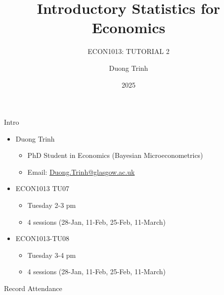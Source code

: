 \documentclass[
  11pt,
  ignorenonframetext,
]{beamer}
\title{Introductory Statistics for Economics}
\subtitle{ECON1013: TUTORIAL 2}
\author{Duong Trinh}
\date{2025}
\institute{University of Glasgow}
\providecommand{\tightlist}{%
  \setlength{\itemsep}{0pt}\setlength{\parskip}{0pt}}
\begin{document}
\frame{\titlepage}

\begin{frame}{Intro}
\protect\hypertarget{intro}{}
\begin{itemize}
\tightlist
\item
  Duong Trinh

  \begin{itemize}
  \tightlist
  \item
    PhD Student in Economics (Bayesian Microeconometrics)
  \item
    Email: \underline{Duong.Trinh@glasgow.ac.uk}
  \end{itemize}
\end{itemize}

\vspace{3mm}

\begin{itemize}
\tightlist
\item
  ECON1013 TU07

  \begin{itemize}
  \tightlist
  \item
    Tuesday 2-3 pm
  \item
    4 sessions (28-Jan, 11-Feb, 25-Feb, 11-March)
  \end{itemize}
\item
  ECON1013-TU08

  \begin{itemize}
  \tightlist
  \item
    Tuesday 3-4 pm
  \item
    4 sessions (28-Jan, 11-Feb, 25-Feb, 11-March)
  \end{itemize}
\end{itemize}
\end{frame}

\begin{frame}{Record Attendance}
\protect\hypertarget{record-attendance}{}
\end{frame}
\end{document}
